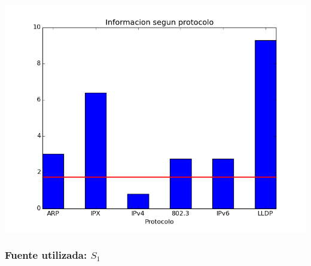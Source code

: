 \documentclass[final,narroweqnarray,inline]{ieee}
\begin{document}
\includegraphics[scale=0.5]{graficos/techint_histogram.png} \\


\subsubsection{Fuente utilizada: $S_{1}$}










\end{document}
